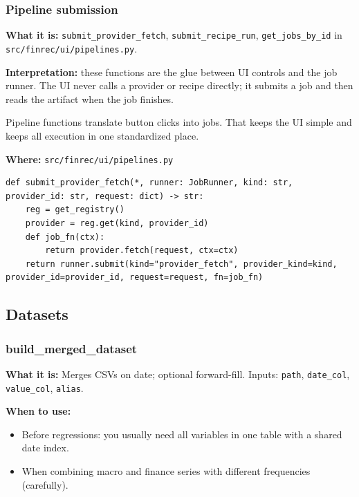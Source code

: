 \documentclass[11pt,a4paper]{article}
\begin{document}
\subsubsection{Pipeline submission}\label{sec:pipeline}

\textbf{What it is:} \texttt{submit\_provider\_fetch}, \texttt{submit\_recipe\_run}, \texttt{get\_jobs\_by\_id} in \texttt{src/finrec/ui/pipelines.py}.

\textbf{Interpretation:} these functions are the glue between UI controls and the job runner. The UI never calls a provider or recipe directly; it submits a job and then reads the artifact when the job finishes.

\begin{intuitionbox}
Pipeline functions translate button clicks into jobs. That keeps the UI simple and keeps all execution in one standardized place.
\end{intuitionbox}

\textbf{Where:} \texttt{src/finrec/ui/pipelines.py}

\begin{lstlisting}
def submit_provider_fetch(*, runner: JobRunner, kind: str, provider_id: str, request: dict) -> str:
    reg = get_registry()
    provider = reg.get(kind, provider_id)
    def job_fn(ctx):
        return provider.fetch(request, ctx=ctx)
    return runner.submit(kind="provider_fetch", provider_kind=kind, provider_id=provider_id, request=request, fn=job_fn)
\end{lstlisting}

\subsection{Datasets}

\subsubsection{build\_merged\_dataset}\label{sec:merge}

\textbf{What it is:} Merges CSVs on date; optional forward-fill. Inputs: \texttt{path}, \texttt{date\_col}, \texttt{value\_col}, \texttt{alias}.

\textbf{When to use:}
\begin{itemize}[leftmargin=2em]
  \item Before regressions: you usually need all variables in one table with a shared date index.
  \item When combining macro and finance series with different frequencies (carefully).
\end{itemize}
\end{document}
